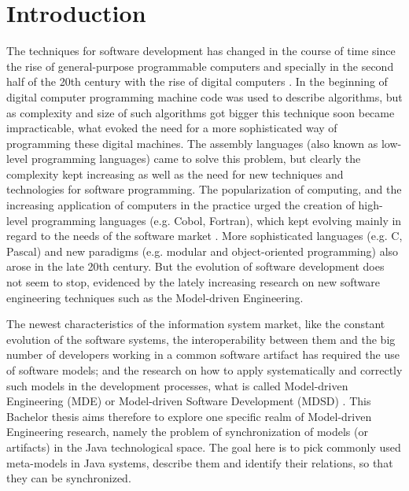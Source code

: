 \documentclass[tuberlin,cic,tc,english,noabntcite]{iiufrgs}
\begin{document}
\tableofcontents


\chapter{Introduction}
The techniques for software development has changed in the course of time since the rise of general-purpose programmable computers and specially in the second half of the 20th century with the rise of digital computers \citep{ceruzzi2003history}. In the beginning of digital computer programming machine code was used to describe algorithms, but as complexity and size of such algorithms got bigger this technique soon became impracticable, what evoked the need for a more sophisticated way of programming these digital machines. The assembly languages (also known as low-level programming languages) came to solve this problem, but clearly the complexity kept increasing as well as the need for new techniques and technologies for software programming. The popularization of computing, and the increasing application of computers in the practice urged the creation of high-level programming languages (e.g. Cobol, Fortran), which kept evolving mainly in regard to the needs of the software market \citep{ceruzzi2003history}. More sophisticated languages (e.g. C, Pascal) and new paradigms (e.g. modular and object-oriented programming) also arose in the late 20th century. But the evolution of software development does not seem to stop, evidenced by the lately increasing research on new software engineering techniques such as the Model-driven Engineering.

The newest characteristics of the information system market, like the constant evolution of the software systems, the interoperability between them and the big number of developers working in a common software artifact has required the use of software models; and the research on how to apply systematically and correctly such models in the development processes, what is called Model-driven Engineering (MDE) or Model-driven Software Development (MDSD) \citep{france2007model}. This Bachelor thesis aims therefore to explore one specific realm of Model-driven Engineering research, namely the problem of synchronization of models (or artifacts) in the Java technological space. The goal here is to pick commonly used meta-models in Java systems, describe them and identify their relations, so that they can be synchronized.
\end{document}
